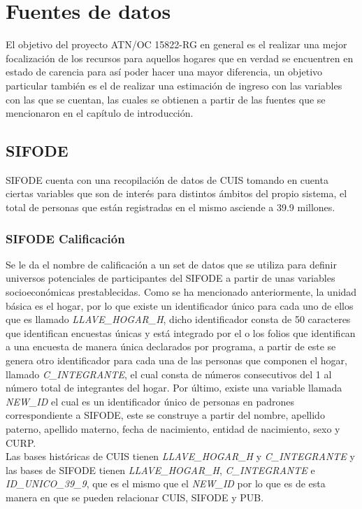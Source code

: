 \chapter{Fuentes de datos}
El objetivo del proyecto ATN/OC 15822-RG en general es el realizar una mejor focalización de los recursos para aquellos hogares que en verdad se encuentren en estado de carencia para así poder hacer una mayor diferencia, un objetivo particular también es el de realizar una estimación de ingreso con las variables con las que se cuentan, las cuales se obtienen a partir de las fuentes que se mencionaron en el capítulo de introducción.\\
\section{SIFODE}
SIFODE cuenta con una recopilación de datos de CUIS tomando en cuenta ciertas variables que son de interés para distintos ámbitos del propio sistema, el total de personas que están registradas en el mismo asciende a 39.9 millones.
\subsection{SIFODE Calificación}
Se le da el nombre de calificación a un set de datos que se utiliza para definir universos potenciales de participantes del SIFODE a partir de unas variables socioeconómicas prestablecidas. Como se ha mencionado anteriormente, la unidad básica es el hogar, por lo que existe un identificador único para cada uno de ellos que es llamado \textit{LLAVE\_HOGAR\_H}, dicho identificador consta de 50 caracteres que identifican encuestas únicas y está integrado por el o los folios que identifican a una encuesta de manera única declarados por programa, a partir de este se genera otro identificador para cada una de las personas que componen el hogar, llamado \textit{C\_INTEGRANTE}, el cual consta de números consecutivos del 1 al número total de integrantes del hogar. Por último, existe una variable llamada \textit{NEW\_ID} el cual es un identificador único de personas en padrones correspondiente a SIFODE, este se construye a partir del nombre, apellido paterno, apellido materno, fecha de nacimiento, entidad de nacimiento, sexo y CURP.\\
Las bases históricas de CUIS tienen \textit{LLAVE\_HOGAR\_H} y \textit{C\_INTEGRANTE} y las bases de SIFODE tienen \textit{LLAVE\_HOGAR\_H}, \textit{C\_INTEGRANTE} e \textit{ID\_UNICO\_39\_9}, que es el mismo que el \textit{NEW\_ID} por lo que es de esta manera en que se pueden relacionar CUIS, SIFODE y PUB.

